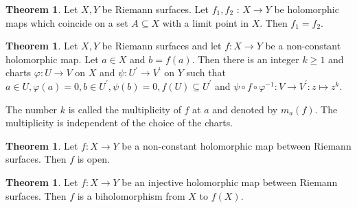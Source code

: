 \documentclass[12pt,a4paper]{book}
\theoremstyle{definition}
\newtheorem{theo}[defn]{Theorem}
\begin{document}
\begin{theo}
    Let $X, Y$ be Riemann surfaces. Let $f_1, f_2$ : $X \rightarrow Y$ be holomorphic maps which coincide on a set $A \subseteq X$ with a limit point in $X$. Then $f_1=f_2$.
\end{theo}
\begin{theo}
    Let $X, Y$ be Riemann surfaces and let $f: X \rightarrow Y$ be a non-constant holomorphic map. Let $a \in X$ and $b=f(a)$. Then there is an integer $k \geq 1$ and charts $\varphi: U \rightarrow V$ on $X$ and $\psi: U^{\prime} \rightarrow V^{\prime}$ on $Y$ such that $a \in U, \varphi(a)=0, b \in U^{\prime}, \psi(b)=0, f(U) \subseteq U^{\prime}$ and $\psi \circ f \circ \varphi^{-1}: V \rightarrow V^{\prime}: z \mapsto z^k$.

    The number $k$ is called the multiplicity of $f$ at $a$ and denoted by $m_a(f)$. The multiplicity is independent of the choice of the charts.
    \label{theorem:local expression}
\end{theo}
\begin{theo}
    Let $f: X \rightarrow Y$ be a non-constant holomorphic map between Riemann surfaces. Then $f$ is open.
\end{theo}
\begin{theo}
    Let $f: X \rightarrow Y$ be an injective holomorphic map between Riemann surfaces. Then $f$ is a biholomorphism from $X$ to $f(X)$.
\end{theo}
\end{document}
